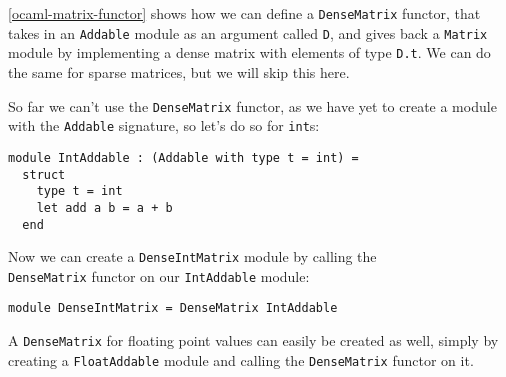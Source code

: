 \autoref{ocaml-matrix-functor} shows how we can define a \verb|DenseMatrix| functor, that takes in an \verb|Addable| module as an argument called \verb|D|, and gives back a \verb|Matrix| module by implementing a dense matrix with elements of type \verb|D.t|. We can do the same for sparse matrices, but we will skip this here.

So far we can't use the \verb|DenseMatrix| functor, as we have yet to create a module with the \verb|Addable| signature, so let's do so for \verb|int|s:
\begin{verbatim}
module IntAddable : (Addable with type t = int) =
  struct
    type t = int
    let add a b = a + b
  end
\end{verbatim}
Now we can create a \verb|DenseIntMatrix| module by calling the \\ \verb|DenseMatrix| functor on our \verb|IntAddable| module:
\begin{verbatim}
module DenseIntMatrix = DenseMatrix IntAddable
\end{verbatim}
A \verb|DenseMatrix| for floating point values can easily be created as well, simply by creating a \verb|FloatAddable| module and calling the \verb|DenseMatrix| functor on it.
